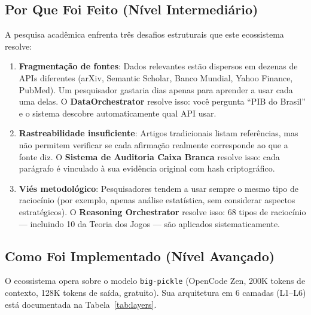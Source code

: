 \documentclass[12pt,a4paper]{article}
\begin{document}
\subsection{Por Que Foi Feito (Nível Intermediário)}

A pesquisa acadêmica enfrenta três desafios estruturais que este ecossistema resolve:

\begin{enumerate}[itemsep=2pt]
  \item \textbf{Fragmentação de fontes}: Dados relevantes estão dispersos em dezenas de APIs diferentes (arXiv, Semantic Scholar, Banco Mundial, Yahoo Finance, PubMed). Um pesquisador gastaria dias apenas para aprender a usar cada uma delas. O \textbf{DataOrchestrator} resolve isso: você pergunta ``PIB do Brasil'' e o sistema descobre automaticamente qual API usar.
  \item \textbf{Rastreabilidade insuficiente}: Artigos tradicionais listam referências, mas não permitem verificar se cada afirmação realmente corresponde ao que a fonte diz. O \textbf{Sistema de Auditoria Caixa Branca} resolve isso: cada parágrafo é vinculado à sua evidência original com hash criptográfico.
  \item \textbf{Viés metodológico}: Pesquisadores tendem a usar sempre o mesmo tipo de raciocínio (por exemplo, apenas análise estatística, sem considerar aspectos estratégicos). O \textbf{Reasoning Orchestrator} resolve isso: 68 tipos de raciocínio --- incluindo 10 da Teoria dos Jogos --- são aplicados sistematicamente.
\end{enumerate}

\subsection{Como Foi Implementado (Nível Avançado)}

O ecossistema opera sobre o modelo \texttt{big-pickle} (OpenCode Zen, 200K tokens de contexto, 128K tokens de saída, gratuito). Sua arquitetura em 6 camadas (L1--L6) está documentada na Tabela~\ref{tab:layers}.
\end{document}
